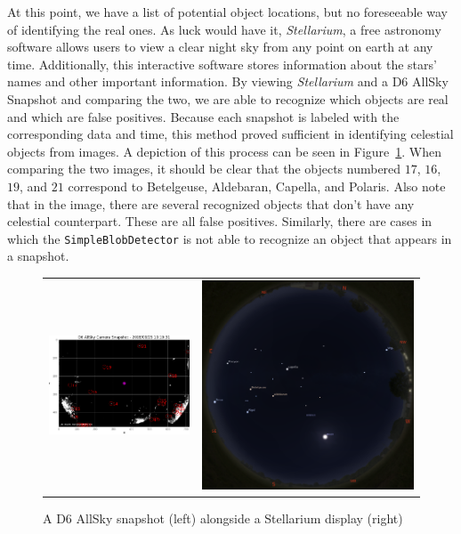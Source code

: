 At this point, we have a list of potential object locations, but no foreseeable way of identifying the real ones.
As luck would have it, \textit{Stellarium}, a free astronomy software allows users to view a clear night sky from any point on earth at any time.
Additionally, this interactive software stores information about the stars' names and other important information.
By viewing \textit{Stellarium} and a D6 AllSky Snapshot and comparing the two, we are able to recognize which objects are real and which are false positives.
Because each snapshot is labeled with the corresponding data and time, this method proved sufficient in identifying celestial objects from images.
A depiction of this process can be seen in Figure~\ref{star_recognition}.  
When comparing the two images, it should be clear that the objects numbered $17$, $16$, $19$, and $21$ correspond to Betelgeuse, Aldebaran, Capella, and Polaris. 
Also note that in the image, there are several recognized objects that don't have any celestial counterpart.
These are all false positives.
Similarly, there are cases in which the \texttt{SimpleBlobDetector} is not able to recognize an object that appears in a snapshot.
\begin{figure}[htb]
\centering
  \begin{tabular}{c|c}
    \includegraphics[width=.6\textwidth]{images/FourStarz_OneFrame.png} & \includegraphics[width=.4\textwidth]{images/zoom_stellarium.png}
  \end{tabular}
  \caption{A D6 AllSky snapshot (left) alongside a Stellarium display (right)}
  \label{star_recognition}
\end{figure}

